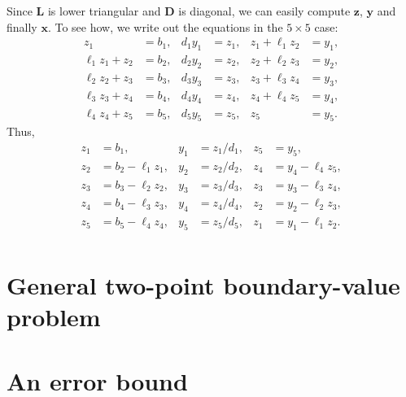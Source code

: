 Since $\boldsymbol{L}$ is lower triangular and $\boldsymbol{D}$ is diagonal,
we can easily compute $\boldsymbol{z}$, $\boldsymbol{y}$ and finally 
$\boldsymbol{x}$.  To see how, we write out the equations in the $5\times5$ 
case:
\begin{align*}
      z_1    &=b_1,& d_1y_1&=z_1,& z_1+\ell_1 z_2&=y_1,\\
\ell_1z_1+z_2&=b_2,& d_2y_2&=z_2,& z_2+\ell_2 z_3&=y_2,\\
\ell_2z_2+z_3&=b_3,& d_3y_3&=z_3,& z_3+\ell_3 z_4&=y_3,\\
\ell_3z_3+z_4&=b_4,& d_4y_4&=z_4,& z_4+\ell_4 z_5&=y_4,\\
\ell_4z_4+z_5&=b_5,& d_5y_5&=z_5,& z_5           &=y_5.
\end{align*}
Thus,
\begin{align*}
z_1&=b_1,           & y_1&=z_1/d_1,& z_5&=y_5,\\
z_2&=b_2-\ell_1 z_1,& y_2&=z_2/d_2,& z_4&=y_4-\ell_4z_5,\\
z_3&=b_3-\ell_2 z_2,& y_3&=z_3/d_3,& z_3&=y_3-\ell_3z_4,\\
z_4&=b_4-\ell_3 z_3,& y_4&=z_4/d_4,& z_2&=y_2-\ell_2z_3,\\
z_5&=b_5-\ell_4 z_4,& y_5&=z_5/d_5,& z_1&=y_1-\ell_1z_2.\\
\end{align*}





\section{General two-point boundary-value problem}

\section{An error bound}
